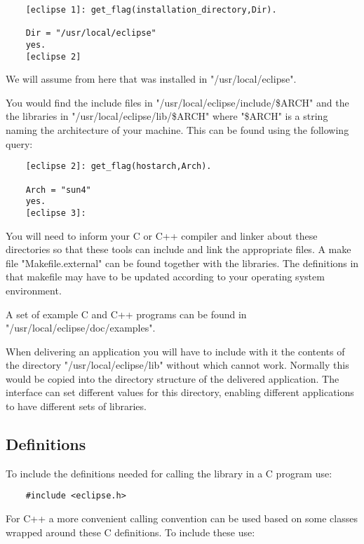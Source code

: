 \begin{verbatim}
    [eclipse 1]: get_flag(installation_directory,Dir).

    Dir = "/usr/local/eclipse"
    yes.
    [eclipse 2]
\end{verbatim}

We will assume from here that {\eclipse} was installed in "/usr/local/eclipse".

You would find the include files in "/usr/local/eclipse/include/\$ARCH"
and the the libraries in "/usr/local/eclipse/lib/\$ARCH" where
"\$ARCH" is a string naming the architecture of your machine.
This can be found using the following {\eclipse} query:

\begin{verbatim}
    [eclipse 2]: get_flag(hostarch,Arch).

    Arch = "sun4"
    yes.
    [eclipse 3]:
\end{verbatim}

You will need to inform your C or C++ compiler and linker about these
directories so that these tools can include and link the appropriate files.
A make file "Makefile.external" can be found together with the libraries.
The definitions in that makefile may  have to be updated according to
your operating system environment.

A set of example C and C++ programs can be found in
"/usr/local/eclipse/doc/examples".

When delivering an application you will have to include with it the
contents of the directory 
"/usr/local/eclipse/lib" without which {\eclipse}
cannot work. Normally this would be copied into the directory structure
of the delivered application. The interface can set different values
for this directory, enabling different applications to have different
sets of libraries.


\subsection{Definitions}

To include the definitions needed for calling the {\eclipse} library
in a C program use:
\begin{verbatim}
    #include <eclipse.h>
\end{verbatim}

For C++ a more convenient calling convention can be used based on
some classes wrapped around these C definitions. To include these use:

